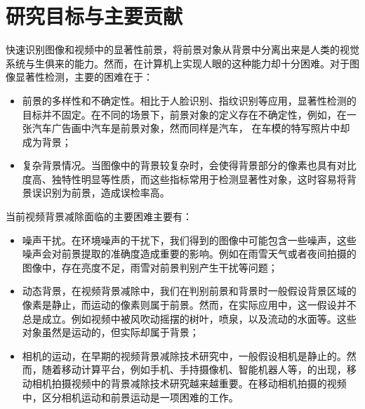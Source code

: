 \section{研究目标与主要贡献}
\label{sec:contents}
快速识别图像和视频中的显著性前景，将前景对象从背景中分离出来是人类的视觉系统与生俱来的能力。然而，在计算机上实现人眼的这种能力却十分困难。对于图像显著性检测，主要的困难在于：
 \begin{itemize}
     \item 前景的多样性和不确定性。相比于人脸识别、指纹识别等应用，显著性检测的目标并不固定。在不同的场景下，前景对象的定义存在不确定性，例如，在一张汽车广告画中汽车是前景对象，然而同样是汽车， 在车模的特写照片中却成为背景；
	\item 复杂背景情况。当图像中的背景较复杂时，会使得背景部分的像素也具有对比度高、独特性明显等性质，而这些指标常用于检测显著性对象，这时容易将背景误识别为前景，造成误检率高。
\end{itemize}
当前视频背景减除面临的主要困难主要有：
\begin{itemize}
	\item 噪声干扰。在环境噪声的干扰下，我们得到的图像中可能包含一些噪声，这些噪声会对前景提取的准确度造成重要的影响。例如在雨雪天气或者夜间拍摄的图像中，存在亮度不足，雨雪对前景判别产生干扰等问题；
    \item 动态背景，在视频背景减除中，我们在判别前景和背景时一般假设背景区域的像素是静止，而运动的像素则属于前景。然而，在实际应用中，这一假设并不总是成立。例如视频中被风吹动摇摆的树叶，喷泉，以及流动的水面等。这些对象虽然是运动的，但实际却属于背景；
    \item 相机的运动，在早期的视频背景减除技术研究中，一般假设相机是静止的。然而，随着移动计算平台，例如手机、手持摄像机、智能机器人等，的出现，移动相机拍摄视频中的背景减除技术研究越来越重要。在移动相机拍摄的视频中，区分相机运动和前景运动是一项困难的工作。
  \end{itemize}

